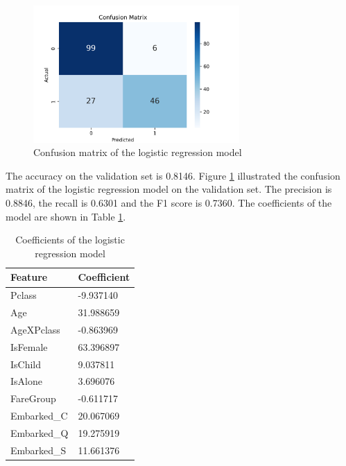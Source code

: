 \documentclass[10pt]{article}
\begin{document}
\begin{figure}[!htbp]
    \centering
    \includegraphics[width=0.7\textwidth]{../hw1/img/Part_II/confusion_matrix.png}
    \caption{Confusion matrix of the logistic regression model}
    \label{fig:confusion_matrix}
\end{figure}

The accuracy on the validation set is 0.8146. Figure \ref{fig:confusion_matrix} illustrated the confusion matrix of the logistic regression model on the validation set. The precision is 0.8846, the recall is 0.6301 and the F1 score is 0.7360. The coefficients of the model are shown in Table \ref{tab:coefficients}.

\begin{table}[!htbp]
    \centering
    \begin{tabular}{@{}ll@{}}
    \toprule
    \textbf{Feature} & \textbf{Coefficient} \\ \midrule
    Pclass           & -9.937140               \\
    Age              & 31.988659               \\
    AgeXPclass       & -0.863969               \\
    IsFemale         & 63.396897                \\
    IsChild          & 9.037811                \\
    IsAlone          & 3.696076               \\
    FareGroup        & -0.611717                \\
    Embarked\_C      & 20.067069                \\
    Embarked\_Q      & 19.275919               \\
    Embarked\_S      & 11.661376               \\ \bottomrule
    \end{tabular}
    \caption{Coefficients of the logistic regression model}
    \label{tab:coefficients}
\end{table}
\end{document}
